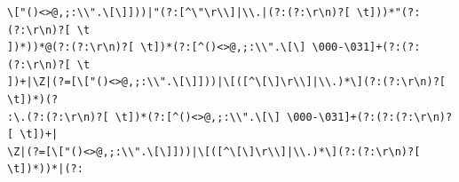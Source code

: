 \documentclass{beamer}
\begin{document}
\begin{frame}[fragile]
\begin{verbatim}
\["()<>@,;:\\".\[\]]))|"(?:[^\"\r\\]|\\.|(?:(?:\r\n)?[ \t]))*"(?:(?:\r\n)?[ \t
])*))*@(?:(?:\r\n)?[ \t])*(?:[^()<>@,;:\\".\[\] \000-\031]+(?:(?:(?:\r\n)?[ \t
])+|\Z|(?=[\["()<>@,;:\\".\[\]]))|\[([^\[\]\r\\]|\\.)*\](?:(?:\r\n)?[ \t])*)(?
:\.(?:(?:\r\n)?[ \t])*(?:[^()<>@,;:\\".\[\] \000-\031]+(?:(?:(?:\r\n)?[ \t])+|
\Z|(?=[\["()<>@,;:\\".\[\]]))|\[([^\[\]\r\\]|\\.)*\](?:(?:\r\n)?[ \t])*))*|(?:
\end{verbatim}
 \endgroup
\end{frame}
\end{document}
